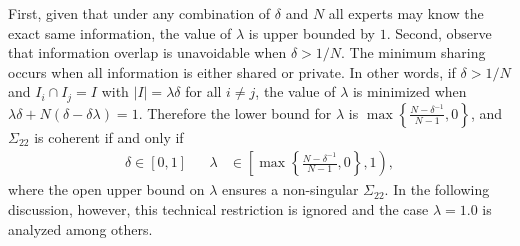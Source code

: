 \documentclass[11pt]{article}
\theoremstyle{definition}
\theoremstyle{definition}
\begin{document}
First, given that under any combination of $\delta$ and $N$ all experts may know the exact same information, the value of $\lambda$ is upper bounded by $1$. Second, observe that information overlap is unavoidable when $\delta > 1/N$. The minimum sharing occurs when all information is either shared or private. In other words, if $\delta > 1/N$ and $I_{i} \cap I_j = I$ with $|I| =  \lambda \delta$ for all $i \neq j$, the value of $\lambda$ is minimized when $\lambda\delta + N(\delta - \delta\lambda) = 1$. Therefore the lower bound for $\lambda$ is $\max \left\{ \frac{N-\delta^{-1}}{N-1}, 0\right\}$, and $\Sigma_{22}$ is coherent if and only if
\begin{align}
\delta \in [0,1] &&  \lambda &\in \left[  \max \left\{ \frac{N-\delta^{-1}}{N-1}, 0\right\}, 1 \right), \label{rhoDomain}
\end{align}
where the open upper bound on $\lambda$ ensures a non-singular $\Sigma_{22}$. In the following discussion, however, this technical restriction is ignored and the case $\lambda = 1.0$ is analyzed among others. 

\end{document}
